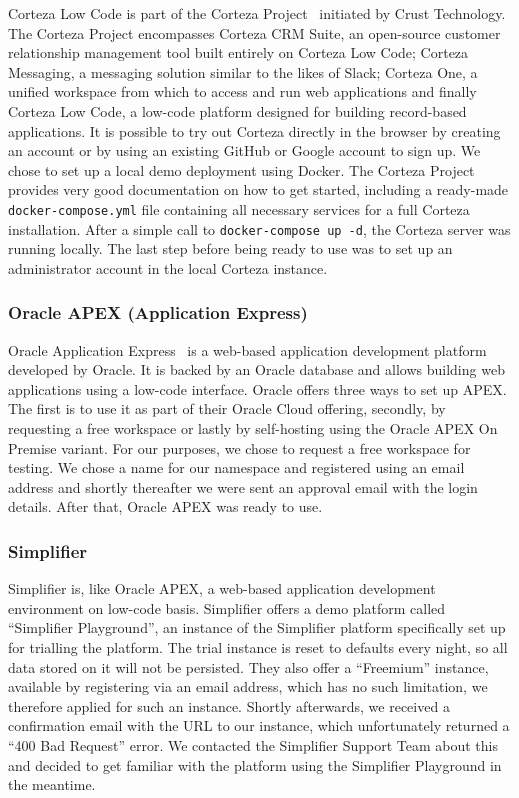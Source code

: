 \documentclass[runningheads]{llncs}
\begin{document}
Corteza Low Code is part of the Corteza Project~\cite{corteza} initiated by Crust Technology. The Corteza Project encompasses Corteza CRM Suite, an open-source customer relationship management tool built entirely on Corteza Low Code; Corteza Messaging, a messaging solution similar to the likes of Slack; Corteza One, a unified workspace from which to access and run web applications and finally Corteza Low Code, a low-code platform designed for building record-based applications. It is possible to try out Corteza directly in the browser by creating an account or by using an existing GitHub or Google account to sign up. We chose to set up a local demo deployment using Docker. The Corteza Project provides very good documentation on how to get started, including a ready-made \texttt{docker-compose.yml} file containing all necessary services for a full Corteza installation. After a simple call to \texttt{docker-compose up -d}, the Corteza server was running locally. The last step before being ready to use was to set up an administrator account in the local Corteza instance.

\subsubsection{Oracle APEX (Application Express)}

Oracle Application Express~\cite{oracle_apex} is a web-based application development platform developed by Oracle. It is backed by an Oracle database and allows building web applications using a low-code interface. Oracle offers three ways to set up APEX. The first is to use it as part of their Oracle Cloud offering, secondly, by requesting a free workspace or lastly by self-hosting using the Oracle APEX On Premise variant. For our purposes, we chose to request a free workspace for testing. We chose a name for our namespace and registered using an email address and shortly thereafter we were sent an approval email with the login details. After that, Oracle APEX was ready to use.

\subsubsection{Simplifier}

Simplifier is, like Oracle APEX, a web-based application development environment on low-code basis. Simplifier offers a demo platform called “Simplifier Playground”, an instance of the Simplifier platform specifically set up for trialling the platform. The trial instance is reset to defaults every night, so all data stored on it will not be persisted. They also offer a “Freemium” instance, available by registering via an email address, which has no such limitation, we therefore applied for such an instance. Shortly afterwards, we received a confirmation email with the URL to our instance, which unfortunately returned a “400 Bad Request” error. We contacted the Simplifier Support Team about this and decided to get familiar with the platform using the Simplifier Playground in the meantime.
\end{document}
